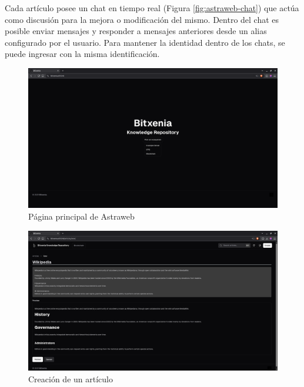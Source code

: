 Cada artículo posee un chat en tiempo real (Figura \ref{fig:astraweb-chat}) que actúa como discusión para la mejora o modificación del mismo. Dentro del chat es posible enviar mensajes y responder a mensajes anteriores desde un alias configurado por el usuario. Para mantener la identidad dentro de los chats, se puede ingresar con la misma identificación.

\begin{figure}[H]
    \centering
    \includegraphics[width=1\linewidth]{img/frontends/astraweb-main-page.png}
    \caption{Página principal de Astraweb}
    \label{fig:astraweb-main-page}
\end{figure}

\begin{figure}[H]
    \centering
    \includegraphics[width=1\linewidth]{img/frontends/create-article.png}
    \caption{Creación de un artículo}
    \label{fig:astraweb-create-article}
\end{figure}


